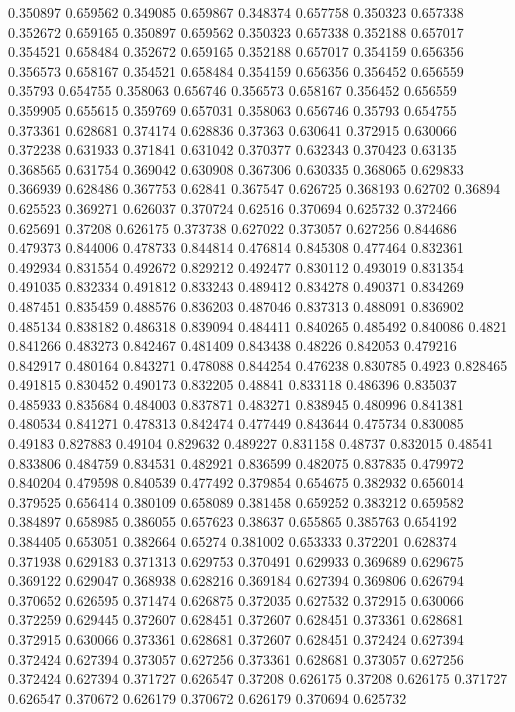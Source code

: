 0.350897 0.659562
0.349085 0.659867
0.348374 0.657758
0.350323 0.657338
0.352672 0.659165
0.350897 0.659562
0.350323 0.657338
0.352188 0.657017
0.354521 0.658484
0.352672 0.659165
0.352188 0.657017
0.354159 0.656356
0.356573 0.658167
0.354521 0.658484
0.354159 0.656356
0.356452 0.656559
0.35793 0.654755
0.358063 0.656746
0.356573 0.658167
0.356452 0.656559
0.359905 0.655615
0.359769 0.657031
0.358063 0.656746
0.35793 0.654755
0.373361 0.628681
0.374174 0.628836
0.37363 0.630641
0.372915 0.630066
0.372238 0.631933
0.371841 0.631042
0.370377 0.632343
0.370423 0.63135
0.368565 0.631754
0.369042 0.630908
0.367306 0.630335
0.368065 0.629833
0.366939 0.628486
0.367753 0.62841
0.367547 0.626725
0.368193 0.62702
0.36894 0.625523
0.369271 0.626037
0.370724 0.62516
0.370694 0.625732
0.372466 0.625691
0.37208 0.626175
0.373738 0.627022
0.373057 0.627256
0.844686 0.479373
0.844006 0.478733
0.844814 0.476814
0.845308 0.477464
0.832361 0.492934
0.831554 0.492672
0.829212 0.492477
0.830112 0.493019
0.831354 0.491035
0.832334 0.491812
0.833243 0.489412
0.834278 0.490371
0.834269 0.487451
0.835459 0.488576
0.836203 0.487046
0.837313 0.488091
0.836902 0.485134
0.838182 0.486318
0.839094 0.484411
0.840265 0.485492
0.840086 0.4821
0.841266 0.483273
0.842467 0.481409
0.843438 0.48226
0.842053 0.479216
0.842917 0.480164
0.843271 0.478088
0.844254 0.476238
0.830785 0.4923
0.828465 0.491815
0.830452 0.490173
0.832205 0.48841
0.833118 0.486396
0.835037 0.485933
0.835684 0.484003
0.837871 0.483271
0.838945 0.480996
0.841381 0.480534
0.841271 0.478313
0.842474 0.477449
0.843644 0.475734
0.830085 0.49183
0.827883 0.49104
0.829632 0.489227
0.831158 0.48737
0.832015 0.48541
0.833806 0.484759
0.834531 0.482921
0.836599 0.482075
0.837835 0.479972
0.840204 0.479598
0.840539 0.477492
0.379854 0.654675
0.382932 0.656014
0.379525 0.656414
0.380109 0.658089
0.381458 0.659252
0.383212 0.659582
0.384897 0.658985
0.386055 0.657623
0.38637 0.655865
0.385763 0.654192
0.384405 0.653051
0.382664 0.65274
0.381002 0.653333
0.372201 0.628374
0.371938 0.629183
0.371313 0.629753
0.370491 0.629933
0.369689 0.629675
0.369122 0.629047
0.368938 0.628216
0.369184 0.627394
0.369806 0.626794
0.370652 0.626595
0.371474 0.626875
0.372035 0.627532
0.372915 0.630066
0.372259 0.629445
0.372607 0.628451
0.372607 0.628451
0.373361 0.628681
0.372915 0.630066
0.373361 0.628681
0.372607 0.628451
0.372424 0.627394
0.372424 0.627394
0.373057 0.627256
0.373361 0.628681
0.373057 0.627256
0.372424 0.627394
0.371727 0.626547
0.37208 0.626175
0.37208 0.626175
0.371727 0.626547
0.370672 0.626179
0.370672 0.626179
0.370694 0.625732
